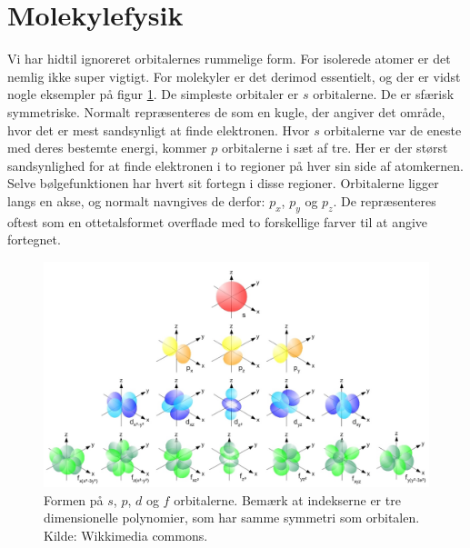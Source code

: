 \documentclass[../../Atom-ogMolekylefysik.tex]{subfiles}
\begin{document}
\section{Molekylefysik}
Vi har hidtil ignoreret orbitalernes rummelige form. For isolerede atomer er det nemlig ikke super vigtigt. For molekyler er det derimod essentielt, og der er vidst nogle eksempler på figur \ref{fig:orbitalform}. De simpleste orbitaler er $s$ orbitalerne. De er sfærisk symmetriske. Normalt repræsenteres de som en kugle, der angiver det område, hvor det er mest sandsynligt at finde elektronen.
Hvor $s$ orbitalerne var de eneste med deres bestemte energi, kommer $p$ orbitalerne i sæt af tre. Her er der størst sandsynlighed for at finde elektronen i to regioner på hver sin side af atomkernen. Selve bølgefunktionen har hvert sit fortegn i disse regioner. Orbitalerne ligger langs en akse, og normalt navngives de derfor: $p_x$, $p_y$ og $p_z$. De repræsenteres oftest som en ottetalsformet overflade med to forskellige farver til at angive fortegnet.
\begin{figure}[h!]
    \centering
    \includegraphics[width = \textwidth]{Atom-ogMolekylefysik/billeder/Single_electron_orbitals.jpg}
    \caption{Formen på $s$, $p$, $d$ og $f$ orbitalerne. Bemærk at indekserne er tre dimensionelle polynomier, som har samme symmetri som orbitalen. Kilde: Wikkimedia commons.}
    \label{fig:orbitalform}
\end{figure}
\end{document}
